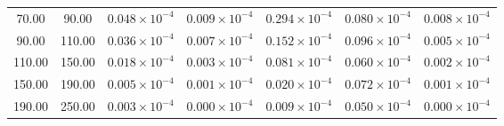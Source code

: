 \begin{tabular}{|c|c||c|c|c|c|c|}
   70.00 &   90.00 & $0.048 \times 10^{-4}$ &  $0.009 \times 10^{-4}$ & $0.294 \times 10^{-4}$ & $0.080 \times 10^{-4}$ & $0.008 \times 10^{-4}$ \\ 
   90.00 &  110.00 & $0.036 \times 10^{-4}$ &  $0.007 \times 10^{-4}$ & $0.152 \times 10^{-4}$ & $0.096 \times 10^{-4}$ & $0.005 \times 10^{-4}$ \\ 
  110.00 &  150.00 & $0.018 \times 10^{-4}$ &  $0.003 \times 10^{-4}$ & $0.081 \times 10^{-4}$ & $0.060 \times 10^{-4}$ & $0.002 \times 10^{-4}$ \\ 
  150.00 &  190.00 & $0.005 \times 10^{-4}$ &  $0.001 \times 10^{-4}$ & $0.020 \times 10^{-4}$ & $0.072 \times 10^{-4}$ & $0.001 \times 10^{-4}$ \\ 
  190.00 &  250.00 & $0.003 \times 10^{-4}$ &  $0.000 \times 10^{-4}$ & $0.009 \times 10^{-4}$ & $0.050 \times 10^{-4}$ & $0.000 \times 10^{-4}$ \\ 
\hline
\end{tabular}
